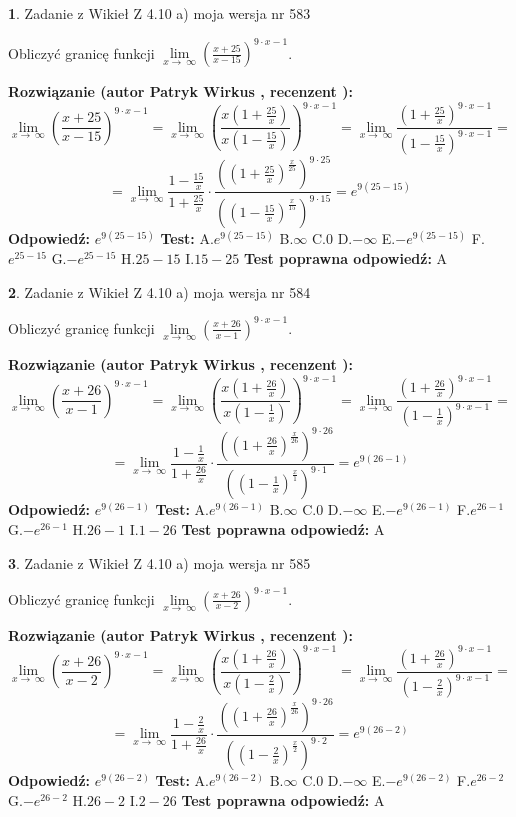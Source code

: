 \documentclass[12pt, a4paper]{article}
\theoremstyle{definition} %
\newtheorem{zad}{}
\newcommand{\zadStart}[1]{\begin{zad}#1\newline}
\newcommand{\zadStop}{\end{zad}}
\newcommand{\rozwStart}[2]{\noindent \textbf{Rozwiązanie (autor #1 , recenzent #2): }\newline}
\newcommand{\rozwStop}{\newline}
\newcommand{\odpStart}{\noindent \textbf{Odpowiedź:}\newline}
\newcommand{\odpStop}{\newline}
\newcommand{\testStart}{\noindent \textbf{Test:}\newline}
\newcommand{\testStop}{\newline}
\newcommand{\kluczStart}{\noindent \textbf{Test poprawna odpowiedź:}\newline}
\newcommand{\kluczStop}{\newline}
\begin{document}
\zadStart{Zadanie z Wikieł Z 4.10 a) moja wersja nr 583}


Obliczyć granicę funkcji  $\lim\limits_{x\to\ \infty}(\frac{x+25}{x-15})^{9\cdot x-1}$.
\zadStop
\rozwStart{Patryk Wirkus}{}
$$\lim\limits_{x\to\ \infty}(\frac{x+25}{x-15})^{9\cdot x-1} = \lim\limits_{x\to\ \infty}(\frac{x(1+\frac{25}{x})}{x(1-\frac{15}{x})})^{9\cdot x-1}=\lim\limits_{x\to\ \infty}\frac{(1+\frac{25}{x})^{9\cdot x-1}}{(1-\frac{15}{x})^{9\cdot x-1}}=$$
$$=\lim\limits_{x\to\ \infty}\frac{1-\frac{15}{x}}{1+\frac{25}{x}}\cdot\frac{((1+\frac{25}{x})^{\frac{x}{25}})^{9\cdot25}}{((1-\frac{15}{x})^{\frac{x}{15}})^{9\cdot15}}=e^{9(25-15)}$$
\rozwStop
\odpStart
$e^{9(25-15)}$
\odpStop
\testStart
A.$e^{9(25-15)}$ B.$\infty$ C.$0$ D.$-\infty$ E.$-e^{9(25-15)}$
F.$e^{25-15}$ G.$-e^{25-15}$
H.$25-15$
I.$15-25$
\testStop
\kluczStart
A
\kluczStop



\zadStart{Zadanie z Wikieł Z 4.10 a) moja wersja nr 584}


Obliczyć granicę funkcji  $\lim\limits_{x\to\ \infty}(\frac{x+26}{x-1})^{9\cdot x-1}$.
\zadStop
\rozwStart{Patryk Wirkus}{}
$$\lim\limits_{x\to\ \infty}(\frac{x+26}{x-1})^{9\cdot x-1} = \lim\limits_{x\to\ \infty}(\frac{x(1+\frac{26}{x})}{x(1-\frac{1}{x})})^{9\cdot x-1}=\lim\limits_{x\to\ \infty}\frac{(1+\frac{26}{x})^{9\cdot x-1}}{(1-\frac{1}{x})^{9\cdot x-1}}=$$
$$=\lim\limits_{x\to\ \infty}\frac{1-\frac{1}{x}}{1+\frac{26}{x}}\cdot\frac{((1+\frac{26}{x})^{\frac{x}{26}})^{9\cdot26}}{((1-\frac{1}{x})^{\frac{x}{1}})^{9\cdot1}}=e^{9(26-1)}$$
\rozwStop
\odpStart
$e^{9(26-1)}$
\odpStop
\testStart
A.$e^{9(26-1)}$ B.$\infty$ C.$0$ D.$-\infty$ E.$-e^{9(26-1)}$
F.$e^{26-1}$ G.$-e^{26-1}$
H.$26-1$
I.$1-26$
\testStop
\kluczStart
A
\kluczStop



\zadStart{Zadanie z Wikieł Z 4.10 a) moja wersja nr 585}


Obliczyć granicę funkcji  $\lim\limits_{x\to\ \infty}(\frac{x+26}{x-2})^{9\cdot x-1}$.
\zadStop
\rozwStart{Patryk Wirkus}{}
$$\lim\limits_{x\to\ \infty}(\frac{x+26}{x-2})^{9\cdot x-1} = \lim\limits_{x\to\ \infty}(\frac{x(1+\frac{26}{x})}{x(1-\frac{2}{x})})^{9\cdot x-1}=\lim\limits_{x\to\ \infty}\frac{(1+\frac{26}{x})^{9\cdot x-1}}{(1-\frac{2}{x})^{9\cdot x-1}}=$$
$$=\lim\limits_{x\to\ \infty}\frac{1-\frac{2}{x}}{1+\frac{26}{x}}\cdot\frac{((1+\frac{26}{x})^{\frac{x}{26}})^{9\cdot26}}{((1-\frac{2}{x})^{\frac{x}{2}})^{9\cdot2}}=e^{9(26-2)}$$
\rozwStop
\odpStart
$e^{9(26-2)}$
\odpStop
\testStart
A.$e^{9(26-2)}$ B.$\infty$ C.$0$ D.$-\infty$ E.$-e^{9(26-2)}$
F.$e^{26-2}$ G.$-e^{26-2}$
H.$26-2$
I.$2-26$
\testStop
\kluczStart
A
\kluczStop
\end{document}
